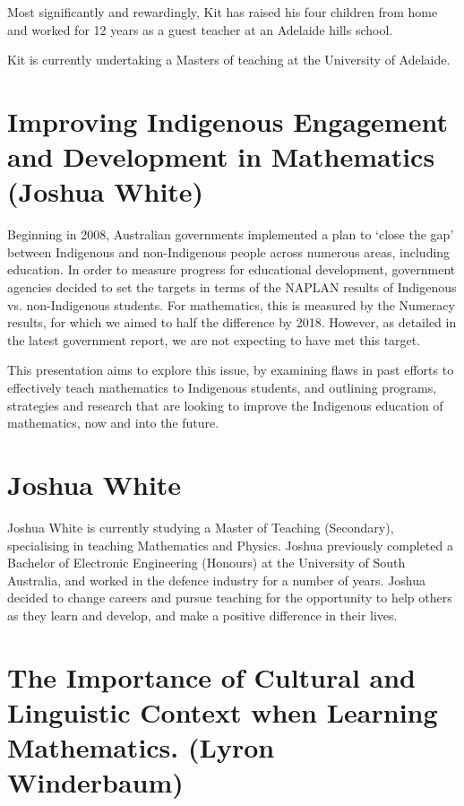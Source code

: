 \documentclass[twoside,14pt,a4paper,notitlepage]{memoir}
\begin{document}
Most significantly and rewardingly, Kit has raised his four children from home and worked for 12 years as a guest teacher at an Adelaide hills school.

Kit is currently undertaking a Masters of teaching at the University of Adelaide.



\section*{Improving Indigenous Engagement and Development in Mathematics (Joshua White)}
\label{aut:white}

Beginning in 2008, Australian governments implemented a plan to ‘close the gap’ between Indigenous and non-Indigenous people across numerous areas, including education. In order to measure progress for educational development, government agencies decided to set the targets in terms of the NAPLAN results of Indigenous vs. non-Indigenous students. For mathematics, this is measured by the Numeracy results, for which we aimed to half the difference by 2018. However, as detailed in the latest government report, we are not expecting to have met this target.
 
This presentation aims to explore this issue, by examining flaws in past efforts to effectively teach mathematics to Indigenous students, and outlining programs, strategies and research that are looking to improve the Indigenous education of mathematics, now and into the future.

\section*{Joshua White}

Joshua White is currently studying a Master of Teaching (Secondary), specialising in teaching Mathematics and Physics. Joshua previously completed a Bachelor of Electronic Engineering (Honours) at the University of South Australia, and worked in the defence industry for a number of years. Joshua decided to change careers and pursue teaching for the opportunity to help others as they learn and develop, and make a positive difference in their lives.



\section*{The Importance of Cultural and Linguistic Context when Learning Mathematics. (Lyron Winderbaum)}
\label{aut:winderbaum}
\end{document}
